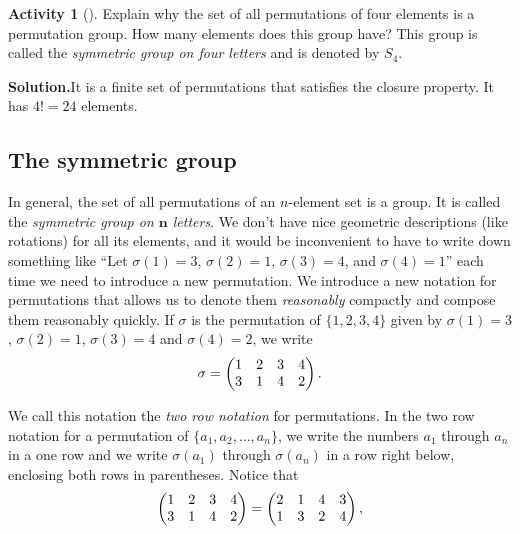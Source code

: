 \documentclass[10pt,]{book}
\theoremstyle{plain}
\theoremstyle{definition}
\newtheorem{activity}[project]{Activity}
\numberwithin{equation}{chapter}
\newcommand{\amp}{&}
\begin{document}
\begin{activity}[]\label{activity-246}
Explain why the set of all permutations of four elements is a permutation group. How many elements does this group have? This group is called the \emph{symmetric group on four letters} and is denoted by \(S_4\).%
\par\medskip\noindent%
\textbf{Solution.}\quad It is a finite set of permutations that satisfies the closure property. It has \(4!= 24\) elements.%
\end{activity}
\typeout{************************************************}
\typeout{************************************************}
\subsection[{The symmetric group}]{The symmetric group}\label{subsection-59}
In general, the set of all permutations of an \(n\)-element set is a group. It is called the \emph{symmetric group on \(\mathbf n\) letters}. We don't have nice geometric descriptions (like rotations) for all its elements, and it would be inconvenient to have to write down something like ``Let \(\sigma(1) =3\), \(\sigma(2) =1\), \(\sigma(3)=4\), and \(\sigma(4)=1\)'' each time we need to introduce a new permutation. We introduce a new notation for permutations that allows us to denote them \emph{reasonably} compactly and compose them reasonably quickly. If \(\sigma\) is the permutation of \(\{1,2,3,4\}\) given by \(\sigma(1)=3\), \(\sigma(2)=1\), \(\sigma(3) =4\) and \(\sigma(4) =2\), we write%
\begin{equation*}
\sigma =\left( \begin{matrix}1\amp 2\amp 3\amp 4\cr3\amp 1\amp 4\amp 2
\end{matrix} \right).
\end{equation*}
%
\par
We call this notation the \emph{two row notation} for permutations. In the two row notation for a permutation of \(\{a_1,a_2,\ldots, a_n\}\), we write the numbers \(a_1\) through \(a_n\) in a one row and we write \(\sigma(a_1)\) through \(\sigma(a_n)\) in a row right below, enclosing both rows in parentheses. Notice that%
\begin{equation*}
\left( \begin{matrix}1\amp 2\amp 3\amp 4\cr3\amp 1\amp 4\amp 2
\end{matrix} \right) = \left(
\begin{matrix}2\amp 1\amp 4\amp 3\cr1\amp 3\amp 2\amp 4
\end{matrix} \right),
\end{equation*}
\end{document}
